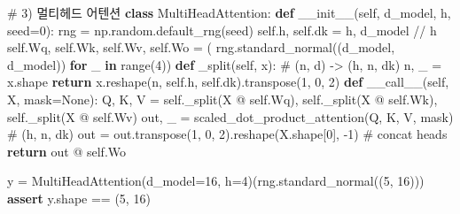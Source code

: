 \documentclass[
  korean,
]{article}
\newenvironment{Shaded}{\begin{snugshade}}{\end{snugshade}}
\newcommand{\BuiltInTok}[1]{\textcolor[rgb]{0.00,0.23,0.31}{#1}}
\newcommand{\CommentTok}[1]{\textcolor[rgb]{0.37,0.37,0.37}{#1}}
\newcommand{\ControlFlowTok}[1]{\textcolor[rgb]{0.00,0.23,0.31}{\textbf{#1}}}
\newcommand{\DecValTok}[1]{\textcolor[rgb]{0.68,0.00,0.00}{#1}}
\newcommand{\FunctionTok}[1]{\textcolor[rgb]{0.28,0.35,0.67}{#1}}
\newcommand{\KeywordTok}[1]{\textcolor[rgb]{0.00,0.23,0.31}{\textbf{#1}}}
\newcommand{\NormalTok}[1]{\textcolor[rgb]{0.00,0.23,0.31}{#1}}
\newcommand{\OperatorTok}[1]{\textcolor[rgb]{0.37,0.37,0.37}{#1}}
\newcommand{\VariableTok}[1]{\textcolor[rgb]{0.07,0.07,0.07}{#1}}
\begin{document}
\begin{Shaded}
\begin{Highlighting}[]
\CommentTok{\# 3) 멀티헤드 어텐션}
\KeywordTok{class}\NormalTok{ MultiHeadAttention:}
    \KeywordTok{def} \FunctionTok{\_\_init\_\_}\NormalTok{(}\VariableTok{self}\NormalTok{, d\_model, h, seed}\OperatorTok{=}\DecValTok{0}\NormalTok{):}
\NormalTok{        rng }\OperatorTok{=}\NormalTok{ np.random.default\_rng(seed)}
        \VariableTok{self}\NormalTok{.h, }\VariableTok{self}\NormalTok{.dk }\OperatorTok{=}\NormalTok{ h, d\_model }\OperatorTok{//}\NormalTok{ h}
        \VariableTok{self}\NormalTok{.Wq, }\VariableTok{self}\NormalTok{.Wk, }\VariableTok{self}\NormalTok{.Wv, }\VariableTok{self}\NormalTok{.Wo }\OperatorTok{=}\NormalTok{ (}
\NormalTok{            rng.standard\_normal((d\_model, d\_model)) }\ControlFlowTok{for}\NormalTok{ \_ }\KeywordTok{in} \BuiltInTok{range}\NormalTok{(}\DecValTok{4}\NormalTok{))}
    \KeywordTok{def}\NormalTok{ \_split(}\VariableTok{self}\NormalTok{, x):                 }\CommentTok{\# (n, d) {-}\textgreater{} (h, n, dk)}
\NormalTok{        n, \_ }\OperatorTok{=}\NormalTok{ x.shape}
        \ControlFlowTok{return}\NormalTok{ x.reshape(n, }\VariableTok{self}\NormalTok{.h, }\VariableTok{self}\NormalTok{.dk).transpose(}\DecValTok{1}\NormalTok{, }\DecValTok{0}\NormalTok{, }\DecValTok{2}\NormalTok{)}
    \KeywordTok{def} \FunctionTok{\_\_call\_\_}\NormalTok{(}\VariableTok{self}\NormalTok{, X, mask}\OperatorTok{=}\VariableTok{None}\NormalTok{):}
\NormalTok{        Q, K, V }\OperatorTok{=} \VariableTok{self}\NormalTok{.\_split(X }\OperatorTok{@} \VariableTok{self}\NormalTok{.Wq), }\VariableTok{self}\NormalTok{.\_split(X }\OperatorTok{@} \VariableTok{self}\NormalTok{.Wk), }\VariableTok{self}\NormalTok{.\_split(X }\OperatorTok{@} \VariableTok{self}\NormalTok{.Wv)}
\NormalTok{        out, \_ }\OperatorTok{=}\NormalTok{ scaled\_dot\_product\_attention(Q, K, V, mask)   }\CommentTok{\# (h, n, dk)}
\NormalTok{        out }\OperatorTok{=}\NormalTok{ out.transpose(}\DecValTok{1}\NormalTok{, }\DecValTok{0}\NormalTok{, }\DecValTok{2}\NormalTok{).reshape(X.shape[}\DecValTok{0}\NormalTok{], }\OperatorTok{{-}}\DecValTok{1}\NormalTok{)   }\CommentTok{\# concat heads}
        \ControlFlowTok{return}\NormalTok{ out }\OperatorTok{@} \VariableTok{self}\NormalTok{.Wo}

\NormalTok{y }\OperatorTok{=}\NormalTok{ MultiHeadAttention(d\_model}\OperatorTok{=}\DecValTok{16}\NormalTok{, h}\OperatorTok{=}\DecValTok{4}\NormalTok{)(rng.standard\_normal((}\DecValTok{5}\NormalTok{, }\DecValTok{16}\NormalTok{)))}
\ControlFlowTok{assert}\NormalTok{ y.shape }\OperatorTok{==}\NormalTok{ (}\DecValTok{5}\NormalTok{, }\DecValTok{16}\NormalTok{)}
\end{Highlighting}
\end{Shaded}
\end{document}
